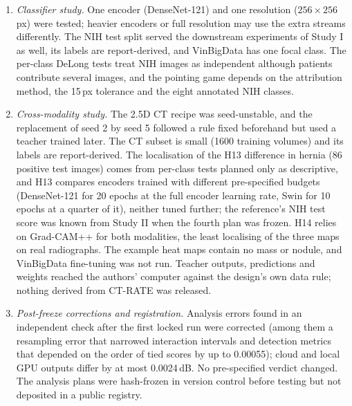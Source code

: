 \begin{enumerate}
 paediatric set with image-level labels and no patient identifiers, and its audit inserts adult nodules into children's radiographs. There
 is no lateral imaging and no reader study. On JSRT the bone overlap of each audit site came from the reference model's bone map. Downstream
 models were not tuned per input, and the overlap analysis is not estimable on TBX11K. The models are for research use only.
\item \emph{Classifier study.} One encoder (DenseNet-121) and one resolution ($256\times256$\,px) were tested; heavier encoders or full
 resolution may use the extra streams differently. The NIH test split served the downstream experiments of Study I as well, its labels are
 report-derived, and VinBigData has one focal class. The per-class DeLong tests treat NIH images as independent although patients contribute
 several images, and the pointing game depends on the attribution method, the 15\,px tolerance and the eight annotated NIH classes.
\item \emph{Cross-modality study.} The 2.5D CT recipe was seed-unstable, and the replacement of seed 2 by seed 5 followed a rule fixed
 beforehand but used a teacher trained later. The CT subset is small (\num{1600} training volumes) and its labels are report-derived. The
 localisation of the H13 difference in hernia (86 positive test images) comes from per-class tests planned only as descriptive, and H13
 compares encoders trained with different pre-specified budgets (DenseNet-121 for 20 epochs at the full encoder learning rate, Swin for 10
 epochs at a quarter of it), neither tuned further; the reference's NIH test score was known from Study II when the fourth plan was frozen.
 H14 relies on
 Grad-CAM++ for both modalities, the least localising of the three maps on real radiographs. The example heat maps contain no mass or nodule,
 and VinBigData fine-tuning was not run. Teacher outputs, predictions and weights reached the authors' computer against the design's own
 data rule; nothing derived from CT-RATE was released.
\item \emph{Post-freeze corrections and registration.} Analysis errors found in an independent check after the first locked run were
 corrected (among them a resampling error that narrowed interaction intervals and detection metrics that depended on the order of tied
 scores by up to 0.00055); cloud and local GPU outputs differ by at most 0.0024\,dB. No pre-specified verdict changed. The analysis plans were
 hash-frozen in version control before testing but not deposited in a public registry.
\end{enumerate}

